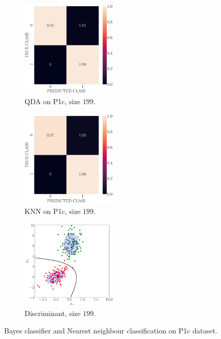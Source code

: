 \documentclass[11pt, a4 paper]{article}
\begin{document}
\begin{figure}[!htbp]
\quad    
    \begin{subfigure}[!htbp]{0.24\textwidth}
       \centering
       \includegraphics[width=1.8in]{../results/ex1/conf_mtx_QD_ML_dataset_P1c_size_199.pdf}
       \caption{QDA on P1c, size $199$.}
       \label{fig:KNN_P1c_199}
    \end{subfigure}
\quad    
    \begin{subfigure}[!htbp]{0.24\textwidth}
       \centering
       \includegraphics[width=1.8in]{../results/ex1/conf_mtx_KNN_dataset_P1c_size_199.pdf}
       \caption{KNN on P1c, size $199$.}
       \label{fig:KNN_P1c_199}
    \end{subfigure}
\quad
    \begin{subfigure}[!htbp]{0.24\textwidth}
       \centering
       \includegraphics[width=1.8in]{../results/ex1/samples_QD_ML_dataset_P1c_size_199.pdf}
       \caption{Discriminant, size $199$.}
       \label{fig:KNN_P1c_199}
    \end{subfigure}
\caption{Bayes classifier and Nearest neighbour classification on P1c dataset.}
\label{fig:ex11P1c}
\end{figure}
\end{document}
